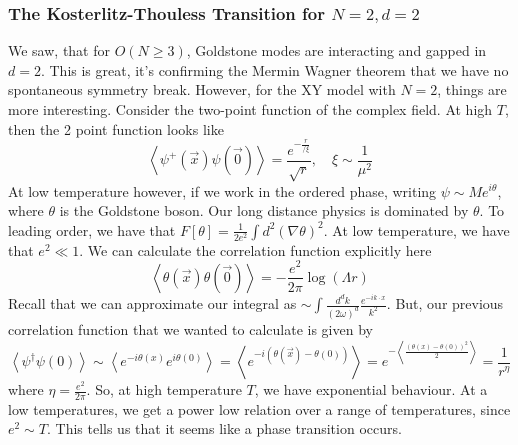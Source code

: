 \subsubsection{The Kosterlitz-Thouless Transition for $ N = 2 , d = 2$ } 
We saw, that for $ O ( N \geq 3 ) $, Goldstone modes 
are interacting and gapped in $ d = 2 $. 
This is great, it's confirming the Mermin Wagner 
theorem that we have no spontaneous symmetry break. 
However, for the XY model with $ N = 2 $, things 
are more interesting. Consider the two-point function of the 
complex field. At high $ T $, then the 2 point function 
looks like 
\[
\left< \psi ^ + ( \vec{x} ) \psi ( \vec{0 } )  \right> = \frac{e ^{  - \frac{r}{/\xi } } }{ \sqrt{ r }  }, \quad 
\xi \sim \frac{1}{\mu ^ 2  }
\] At low temperature however, if we work in 
the ordered phase, writing $ \psi \sim M e ^{ i \theta } $, where $ \theta $ 
is the Goldstone boson. Our long distance physics 
is dominated by $ \theta $. To leading order, 
we have that $ F [ \theta ]  = \frac{1}{2 e ^ 2 } \int d ^ 2 ( \nabla \theta ) ^ 2$. 
At low temperature, we have that $ e ^ 2 \ll 1 $. 
We can calculate the correlation function explicitly here 
\[
\left< \theta ( \vec{x} ) \theta ( \vec{0} )  \right>  = - \frac{e ^ 2 }{ 2 \pi } \log ( \Lambda r ) 
\] Recall that we can approximate our integral as $ \sim \int \frac{d ^ d k }{ ( 2 \omega  ) ^ d } \frac{ e ^{  - i k \cdot  x } }{ k ^ 2}$. 
But, our previous correlation function that we wanted to calculate is given by 
\[
\left< \psi ^ \dagger \psi ( 0 )  \right> \sim \left< e ^{  - i \theta ( x ) } e ^{  i \theta ( 0 ) } \right>
= \left< e ^{  - i ( \theta ( \vec{x} ) - \theta ( 0 ) ) } \right> = e^{  - \left< 
\frac{ ( \theta ( x ) - \theta ( 0 ) ) ^ 2  }{ 2 } \right> }  = \frac{1}{r ^{ \eta } } 
\] where $ \eta = \frac{ e ^ 2 }{ 2 \pi } $. 
So, at high temperature $ T $, we have exponential behaviour. 
At a low temperatures, we get a power low relation over a range of temperatures, 
since $ e ^ 2 \sim T $. This tells us 
that it seems like a phase transition occurs. 


